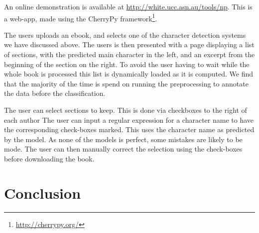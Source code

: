 \documentclass[11pt,a4paper]{article}
\begin{document}
An online demonstration is available at \url{http://white.ucc.asn.au/tools/np}.
This is a web-app, made using the CherryPy framework\footnote{\url{http://cherrypy.org/}}.


The users uploads an ebook, and selects one of the character detection systems we have discussed above.
The users is then presented with a page displaying a list of sections,
with the predicted main character in the left, and an excerpt from the beginning of the section on the right.
To avoid the user having to wait while the whole book is processed this list is dynamically loaded as it is computed.
We find that the majority of the time is spend on running the preprocessing to annotate the data before the classification.

The user can select sections to keep.
This is done via checkboxes to the right of each author
The user can input a regular expression for a character name to have the corresponding check-boxes marked.
This uses the character name as predicted by the model.
As none of the models is perfect, some mistakes are likely to be mode.
The user can then manually correct the selection using the check-boxes before downloading the book.




\section{Conclusion}\label{sec:conclusion}

\clearpage

\end{document}
